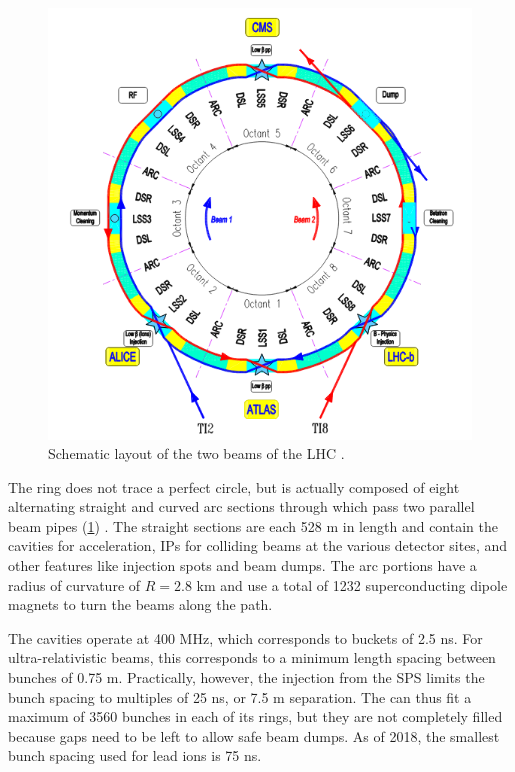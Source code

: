 \begin{figure}[t]
\includegraphics{LHC_schematic.png}
\caption{Schematic layout of the two beams of the \acs{LHC} \cite{Bruning:2004ej}.}
\label{fig:lhc_schematic}
\end{figure}

The \lhc ring does not trace a perfect circle, but is actually composed of eight alternating straight and curved arc sections through which pass two parallel beam pipes (\cref{fig:lhc_schematic}) \cite{Bruning:2004ej}.
The straight sections are each 528 m in length and contain the \rf cavities for acceleration, \acp{IP} for colliding beams at the various detector sites, and other features like injection spots and beam dumps.
The arc portions have a radius of curvature of $R = 2.8$ km and use a total of 1232 superconducting dipole magnets to turn the beams along the path.

The \rf cavities operate at 400 MHz, which corresponds to \rf buckets of 2.5 ns.
For ultra-relativistic beams, this corresponds to a minimum length spacing between bunches of 0.75 m.
Practically, however, the injection from the \ac{SPS} limits the bunch spacing to multiples of 25 ns, or 7.5 m separation.
The \lhc can thus fit a maximum of 3560 bunches in each of its rings, but they are not completely filled because gaps need to be left to allow safe beam dumps.
As of 2018, the smallest bunch spacing used for lead ions is 75 ns.

